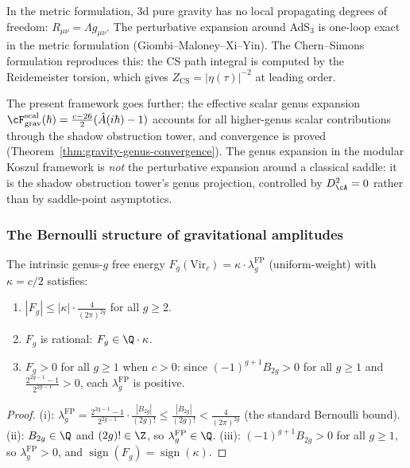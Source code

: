 In the metric formulation, 3d pure gravity has no local propagating
degrees of freedom: $R_{\mu\nu} = \Lambda g_{\mu\nu}$. The
perturbative expansion around AdS$_3$ is one-loop exact in the
metric formulation (Giombi--Maloney--Xi--Yin). The Chern--Simons
formulation reproduces this: the CS path integral is computed by
the Reidemeister torsion, which gives
$Z_{\mathrm{CS}} = |\eta(\tau)|^{-2}$ at leading order.

The present framework goes further: the effective scalar genus
expansion
$\cF_{\mathrm{grav}}^{\mathrm{scal}}(\hbar)
= \frac{c-26}{2}(\hat A(i\hbar) - 1)$ accounts for all
higher-genus scalar contributions through the shadow obstruction tower, and
convergence is proved (Theorem~\ref{thm:gravity-genus-convergence}).
The genus expansion in the modular Koszul framework
is \emph{not} the perturbative expansion around a classical saddle:
it is the shadow obstruction tower's genus projection, controlled by $D_\cA^2 = 0$ rather than by
saddle-point asymptotics.

\subsubsection*{The Bernoulli structure of gravitational amplitudes}

\begin{proposition}
\label{prop:gravity-bernoulli-control}
The intrinsic genus-$g$ free energy $F_g(\mathrm{Vir}_c) = \kappa \cdot \lambda_g^{\mathrm{FP}}$
\textup{(}uniform-weight\textup{)}
with $\kappa = c/2$ satisfies:
\begin{enumerate}[label=\textup{(\roman*)}]
\item $|F_g| \le |\kappa| \cdot
 \frac{4}{(2\pi)^{2g}}$ for all $g \ge 2$.
\item $F_g$ is rational: $F_g \in \Q \cdot \kappa$.
\item $F_g > 0$ for all $g \ge 1$ when $c > 0$:
 since $(-1)^{g+1}B_{2g} > 0$ for all $g \ge 1$
 and $\frac{2^{2g-1}-1}{2^{2g-1}} > 0$, each
 $\lambda_g^{\mathrm{FP}}$ is positive.
\end{enumerate}
\end{proposition}

\begin{proof}
(i): $\lambda_g^{\mathrm{FP}}
= \frac{2^{2g-1}-1}{2^{2g-1}} \cdot \frac{|B_{2g}|}{(2g)!}
\le \frac{|B_{2g}|}{(2g)!} < \frac{4}{(2\pi)^{2g}}$
(the standard Bernoulli bound).
(ii): $B_{2g} \in \Q$ and $(2g)! \in \Z$, so
$\lambda_g^{\mathrm{FP}} \in \Q$.
(iii): $(-1)^{g+1}B_{2g} > 0$ for all $g \ge 1$,
so $\lambda_g^{\mathrm{FP}} > 0$, and
$\operatorname{sign}(F_g) = \operatorname{sign}(\kappa)$.
\end{proof}


